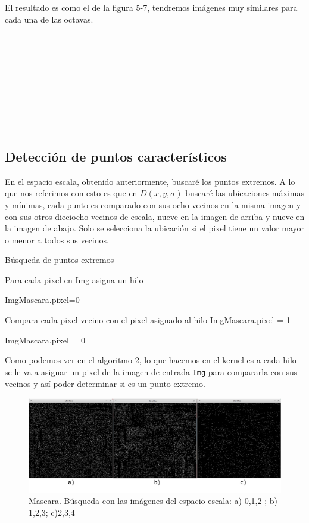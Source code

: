 El resultado es como el de la figura 5-7, tendremos imágenes muy similares para cada una de las octavas. 
\\\\\\\\\\\\\\\\\\\\


\subsection{Detección de puntos característicos}
En el espacio escala, obtenido anteriormente, buscaré los puntos extremos. A lo que nos referimos con esto es que en $D(x,y,\sigma)$ buscaré las ubicaciones máximas y mínimas, cada punto es comparado con sus ocho vecinos en la misma imagen y con sus otros dieciocho vecinos de escala, nueve en la imagen de arriba y nueve en la imagen de abajo. Solo se selecciona la ubicación si el pixel tiene un valor mayor o menor a todos sus vecinos.\\


\begin{algorithm}[H]
\caption{Búsqueda de puntos extremos}
 Para cada pixel en Img asigna un hilo\;
 
 {
	{
		ImgMascara.pixel=0\;
	}{
		{
			Compara cada pixel vecino con el pixel asignado al hilo\;
			{
				ImgMascara.pixel = 1\;			
			}{
				ImgMascara.pixel = 0\;
			
			}
		
		}
		
	}
 }
	
\end{algorithm}


Como podemos ver en el algoritmo 2, lo que hacemos en el kernel es a cada hilo se le va a asignar un pixel de la imagen de entrada \texttt{Img} para compararla con sus vecinos y así poder determinar si es un punto extremo.\\ 
 
\begin{figure}[h]
			\centering
				\includegraphics[scale=0.3]{img/minmaxs.jpg}
			\caption{Mascara.  Búsqueda con las imágenes del espacio escala: a) 0,1,2 ; b) 1,2,3; c)2,3,4  }
\end{figure} 
 
